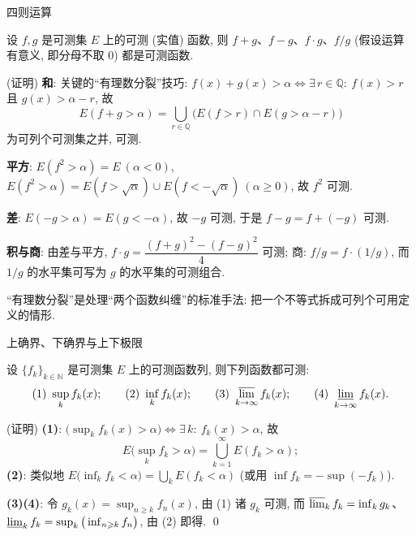 \begin{frame}{四则运算}

\begin{thm}[四则运算]
设 $f, g$ 是可测集 $E$ 上的可测 (实值) 函数, 则 $f + g$、$f - g$、$f \cdot g$、$f/g$ (假设运算有意义, 即分母不取 $0$) 都是可测函数.
\end{thm}

\startproof[bg=yellow, fg=red](证明)
\textbf{和}: 关键的``有理数分裂''技巧: $f(x) + g(x) > \alpha \iff \exists\, r \in \mathbb{Q}:\ f(x) > r$ 且 $g(x) > \alpha - r$, 故
\[
E(f + g > \alpha) = \bigcup_{r \in \mathbb{Q}} \big(E(f > r) \cap E(g > \alpha - r)\big)
\]
为可列个可测集之并, 可测.

\pause

\textbf{平方}: $E(f^2 > \alpha) = E\ ( \alpha < 0)$, $E(f^2 > \alpha) = E(f > \sqrt{\alpha}) \cup E(f < -\sqrt{\alpha})\ (\alpha \geqslant 0)$, 故 $f^2$ 可测.

\textbf{差}: $E(-g > \alpha) = E(g < -\alpha)$, 故 $-g$ 可测, 于是 $f - g = f + (-g)$ 可测.

\textbf{积与商}: 由差与平方, $f \cdot g = \dfrac{(f+g)^2 - (f-g)^2}{4}$ 可测; 商: $f/g = f \cdot (1/g)$, 而 $1/g$ 的水平集可写为 $g$ 的水平集的可测组合.

\pause

\begin{remark}
``有理数分裂''是处理``两个函数纠缠''的标准手法: 把一个不等式拆成\alert{可列个}可用定义的情形.
\end{remark}

\end{frame}


\begin{frame}{上确界、下确界与上下极限}

\begin{thm}[确界与极限可测]
设 $\{f_k\}_{k \in \mathbb{N}}$ 是可测集 $E$ 上的可测函数列, 则下列函数都可测:
\[
\text{(1) } \sup_k f_k(x); \qquad
\text{(2) } \inf_k f_k(x); \qquad
\text{(3) } \varlimsup_{k \to \infty} f_k(x); \qquad
\text{(4) } \varliminf_{k \to \infty} f_k(x).
\]
\end{thm}

\startproof[bg=yellow, fg=red](证明)
\textbf{(1)}: $\big(\sup_k f_k(x) > \alpha\big) \iff \exists\, k:\ f_k(x) > \alpha$, 故
\[
E\Big(\sup_k f_k > \alpha\Big) = \bigcup_{k=1}^\infty E(f_k > \alpha);
\]
\textbf{(2)}: 类似地 $E\big(\inf_k f_k < \alpha\big) = \bigcup_k E(f_k < \alpha)$ (或用 $\inf f_k = -\sup(-f_k)$).

\pause

\textbf{(3)(4)}: 令 $g_k(x) = \sup_{n \geqslant k} f_n(x)$, 由 (1) 诸 $g_k$ 可测, 而
$\varlimsup_k f_k = \inf_k g_k$、$\varliminf_k f_k = \sup_k \big(\inf_{n \geqslant k} f_n\big)$, 由 (2) 即得.
\qed

\end{frame}

